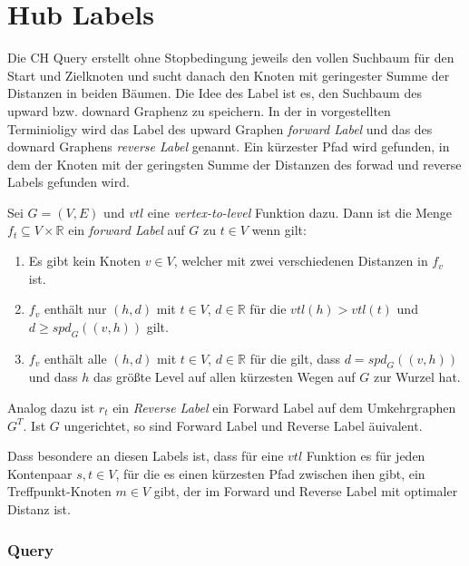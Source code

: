 \chapter{Hub Labels}\label{chapter:hl}

Die CH Query erstellt ohne Stopbedingung jeweils den vollen Suchbaum für den Start und Zielknoten und sucht danach den Knoten mit geringester Summe der Distanzen in beiden Bäumen.
Die Idee des Label ist es, den Suchbaum des upward bzw. downard Graphenz zu speichern.
In der in \cite{abraham2011hub} vorgestellten Terminioligy wird das Label des upward Graphen \emph{forward Label} und das des downard Graphens \emph{reverse Label} genannt.
Ein kürzester Pfad wird gefunden, in dem der Knoten mit der geringsten Summe der Distanzen des forwad und reverse Labels gefunden wird.

\begin{definition}
    Sei $G = (V, E)$ und ${vtl}$ eine \emph{vertex-to-level} Funktion dazu. Dann ist die Menge $f_t \subseteq V \times \mathbb{R}$ ein \emph{forward Label} auf $G$ zu $t \in V$ wenn gilt:

    \begin{enumerate}
        \item
              Es gibt kein Knoten $v \in V$, welcher mit zwei verschiedenen Distanzen in $f_v$ ist.

        \item
              $f_v$ enthält nur $(h, d)$ mit $t \in V$, $d \in \mathbb{R}$ für die ${vtl}(h) > {vtl}(t)$ und $d \geq {spd}_G ((v, h))$ gilt.

        \item
              $f_v$ enthält alle $(h, d)$ mit $t \in V$, $d \in \mathbb{R}$ für die gilt, dass $d = {spd}_G ((v, h))$ und dass $h$ das größte Level auf allen kürzesten Wegen auf $G$ zur Wurzel hat.
    \end{enumerate}

    Analog dazu ist $r_t$ ein \emph{Reverse Label} ein Forward Label auf dem Umkehrgraphen $G^T$. Ist $G$ ungerichtet, so sind Forward Label und Reverse Label äuivalent.
\end{definition}

Dass besondere an diesen Labels ist, dass für eine ${vtl}$ Funktion es für jeden Kontenpaar $s, t \in V$, für die es einen kürzesten Pfad zwischen ihen gibt, ein Treffpunkt-Knoten $m \in V$ gibt, der im Forward und Reverse Label mit optimaler Distanz ist.

\subsection{Query}

